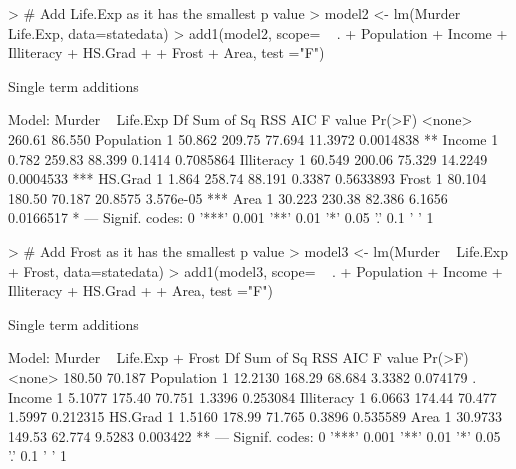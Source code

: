 \documentclass{article}
\begin{document}
\begin{Schunk}
\begin{Sinput}
> # Add Life.Exp as it has the smallest p value
> model2 <- lm(Murder ~ Life.Exp, data=statedata)
> add1(model2, scope= ~ . + Population + Income + Illiteracy + HS.Grad + 
+        Frost + Area, test ="F")
\end{Sinput}
\begin{Soutput}
Single term additions

Model:
Murder ~ Life.Exp
           Df Sum of Sq    RSS    AIC F value    Pr(>F)    
<none>                  260.61 86.550                      
Population  1    50.862 209.75 77.694 11.3972 0.0014838 ** 
Income      1     0.782 259.83 88.399  0.1414 0.7085864    
Illiteracy  1    60.549 200.06 75.329 14.2249 0.0004533 ***
HS.Grad     1     1.864 258.74 88.191  0.3387 0.5633893    
Frost       1    80.104 180.50 70.187 20.8575 3.576e-05 ***
Area        1    30.223 230.38 82.386  6.1656 0.0166517 *  
---
Signif. codes:  0 '***' 0.001 '**' 0.01 '*' 0.05 '.' 0.1 ' ' 1
\end{Soutput}
\end{Schunk}

\begin{Schunk}
\begin{Sinput}
> # Add Frost as it has the smallest p value
> model3 <- lm(Murder ~ Life.Exp + Frost, data=statedata)
> add1(model3, scope= ~ . + Population + Income + Illiteracy + HS.Grad + 
+        Area, test ="F")
\end{Sinput}
\begin{Soutput}
Single term additions

Model:
Murder ~ Life.Exp + Frost
           Df Sum of Sq    RSS    AIC F value   Pr(>F)   
<none>                  180.50 70.187                    
Population  1   12.2130 168.29 68.684  3.3382 0.074179 . 
Income      1    5.1077 175.40 70.751  1.3396 0.253084   
Illiteracy  1    6.0663 174.44 70.477  1.5997 0.212315   
HS.Grad     1    1.5160 178.99 71.765  0.3896 0.535589   
Area        1   30.9733 149.53 62.774  9.5283 0.003422 **
---
Signif. codes:  0 '***' 0.001 '**' 0.01 '*' 0.05 '.' 0.1 ' ' 1
\end{Soutput}
\end{Schunk}
\end{document}
